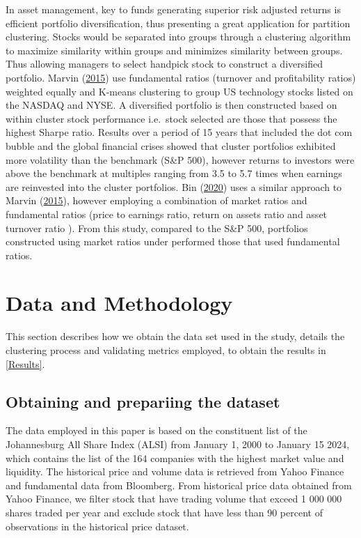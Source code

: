 \documentclass[11pt,preprint, authoryear]{elsarticle}
\numberwithin{equation}{section}
\numberwithin{figure}{section}
\numberwithin{table}{section}
\begin{document}
In asset management, key to funds generating superior risk adjusted
returns is efficient portfolio diversification, thus presenting a great
application for partition clustering. Stocks would be separated into
groups through a clustering algorithm to maximize similarity within
groups and minimizes similarity between groups. Thus allowing managers
to select handpick stock to construct a diversified portfolio. Marvin
(\protect\hyperlink{ref-marvin2015creating}{2015}) use fundamental
ratios (turnover and profitability ratios) weighted equally and K-means
clustering to group US technology stocks listed on the NASDAQ and NYSE.
A diversified portfolio is then constructed based on within cluster
stock performance i.e.~stock selected are those that possess the highest
Sharpe ratio. Results over a period of 15 years that included the dot
com bubble and the global financial crises showed that cluster
portfolios exhibited more volatility than the benchmark (S\&P 500),
however returns to investors were above the benchmark at multiples
ranging from 3.5 to 5.7 times when earnings are reinvested into the
cluster portfolios. Bin (\protect\hyperlink{ref-bin2020k}{2020}) uses a
similar approach to Marvin
(\protect\hyperlink{ref-marvin2015creating}{2015}), however employing a
combination of market ratios and fundamental ratios (price to earnings
ratio, return on assets ratio and asset turnover ratio ). From this
study, compared to the S\&P 500, portfolios constructed using market
ratios under performed those that used fundamental ratios. \newpage

\hypertarget{data-and-methodology}{%
\section{Data and Methodology}\label{data-and-methodology}}

This section describes how we obtain the data set used in the study,
details the clustering process and validating metrics employed, to
obtain the results in \ref{Results}.

\hypertarget{obtaining-and-prepariing-the-dataset}{%
\subsection{Obtaining and prepariing the
dataset}\label{obtaining-and-prepariing-the-dataset}}

The data employed in this paper is based on the constituent list of the
Johannesburg All Share Index (ALSI) from January 1, 2000 to January 15
2024, which contains the list of the 164 companies with the highest
market value and liquidity. The historical price and volume data is
retrieved from Yahoo Finance and fundamental data from Bloomberg. From
historical price data obtained from Yahoo Finance, we filter stock that
have trading volume that exceed 1 000 000 shares traded per year and
exclude stock that have less than 90 percent of observations in the
historical price dataset.
\end{document}
